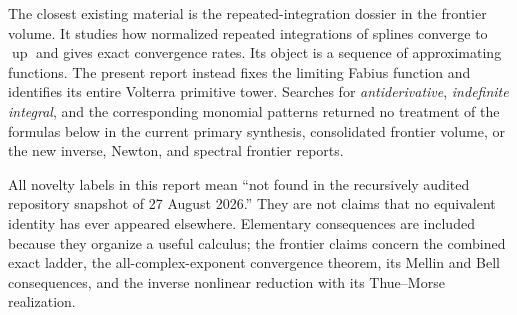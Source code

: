 \documentclass[11pt,oneside]{article}
\theoremstyle{definition}
\theoremstyle{remark}
\newcommand{\Up}{\operatorname{up}}
\newcommand{\1}{\mathbf 1}
\begin{document}
The closest existing material is the repeated-integration dossier in the
frontier volume.  It studies how normalized repeated integrations of splines
converge to $\Up$ and gives exact convergence rates.  Its object is a sequence
of approximating functions.  The present report instead fixes the limiting
Fabius function and identifies its entire Volterra primitive tower.  Searches
for \emph{antiderivative}, \emph{indefinite integral}, and the corresponding
monomial patterns returned no treatment of the formulas below in the current
primary synthesis, consolidated frontier volume, or the new inverse, Newton,
and spectral frontier reports.

\begin{boxedremark}
All novelty labels in this report mean ``not found in the recursively audited
repository snapshot of 27 August 2026.''  They are not claims that no equivalent
identity has ever appeared elsewhere.  Elementary consequences are included
because they organize a useful calculus; the frontier claims concern the
combined exact ladder, the all-complex-exponent convergence theorem, its Mellin
and Bell consequences, and the inverse nonlinear reduction with its
Thue--Morse realization.
\end{boxedremark}
\end{document}
